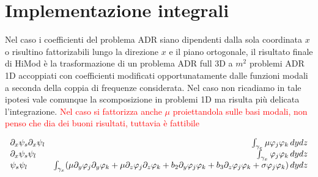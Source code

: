 \section{Implementazione integrali}

Nel caso i coefficienti del problema ADR siano dipendenti dalla sola coordinata $x$ o risultino fattorizabili lungo la direzione $x$ e il piano ortogonale, il risultato finale di HiMod \`e la trasformazione di un problema ADR full 3D a $m^2$ problemi ADR 1D accoppiati con coefficienti modificati opportunatamente dalle funzioni modali a seconda della coppia di frequenze considerata. Nel caso non ricadiamo in tale ipotesi vale comunque la scomposizione in problemi 1D ma risulta pi\`u delicata l'integrazione.
\textcolor{red}{Nel caso si fattorizza anche $\mu$ proiettandola sulle basi modali, non penso che dia dei buoni risultati, tuttavia \`e fattibile}

\begin{equation}
\begin{array}{l r}
\partial_x\psi_s\partial_x\psi_l & \int_{\gamma_x} \mu\varphi_j\varphi_k\,dydz \\
\partial_x\psi_s\psi_l & \int_{\gamma_x}\varphi_j\varphi_k\,dydz\\
\psi_s\psi_l & \int_{\gamma_x}(\mu\partial_y\varphi _j\partial_y\varphi _k + \mu\partial_z\varphi _j\partial_z\varphi _k + b_2\partial_y\varphi_j\varphi_k +b_3\partial_z\varphi_j\varphi_k + \sigma\varphi_j\varphi_k)\,dydz
\end{array}
\end{equation}